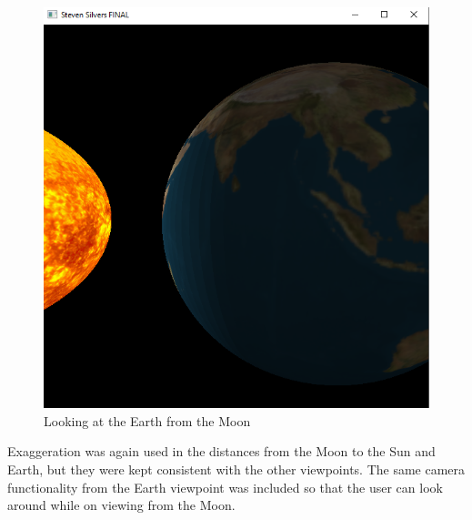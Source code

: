 \documentclass[12pt,serif,draftclsnofoot,onecolumn]{IEEEtran}
\begin{document}
	\begin{figure}[h]
	\includegraphics[scale=.67]{cap4}
	\caption{Looking at the Earth from the Moon}
	\end{figure}

	\par
			Exaggeration was again used in the distances from the Moon to the Sun and Earth, but they were kept consistent with the other viewpoints. The same camera functionality from the Earth viewpoint was included so that the user can look around while on viewing from the Moon.		
	\newline
\end{document}
